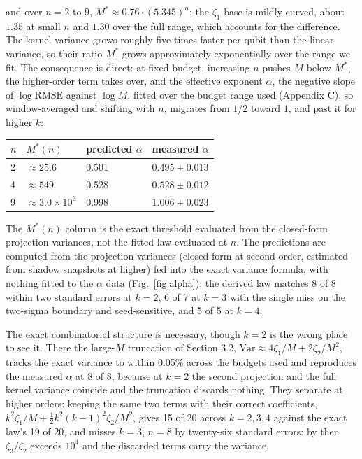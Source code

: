 \documentclass[a4paper,superscriptaddress,nofootinbib,onecolumn,nopdfoutputerror]{quantumarticle}
\begin{document}
and over \(n = 2\) to \(9\), \(M^* \approx 0.76 \cdot (5.345)^n\); the
\(\zeta_1\) base is mildly curved, about \(1.35\) at small \(n\) and
\(1.30\) over the full range, which accounts for the difference. The
kernel variance grows roughly five times faster per qubit than the linear
variance, so their ratio \(M^*\) grows approximately exponentially over
the range we fit. The consequence is direct: at fixed budget, increasing
\(n\) pushes \(M\) below \(M^*\), the higher-order term takes over, and the
effective exponent \(\alpha\), the negative slope of
\(\log \mathrm{RMSE}\) against \(\log M\), fitted over the budget range
used (Appendix C), so window-averaged and shifting with \(n\), migrates
from \(1/2\) toward \(1\), and past it for higher \(k\):

\begin{center}
\setlength{\tabcolsep}{10pt}
\begin{tabular}{@{}llll@{}}
\toprule
\(n\) & \(M^*(n)\) & predicted \(\alpha\) & measured \(\alpha\) \\
\midrule
2 & \(\approx 25.6\) & 0.501 & \(0.495 \pm 0.013\) \\
4 & \(\approx 549\) & 0.528 & \(0.528 \pm 0.012\) \\
9 & \(\approx 3.0 \times 10^{6}\) & 0.998 & \(1.006 \pm 0.023\) \\
\bottomrule
\end{tabular}
\end{center}

The \(M^*(n)\) column is the exact threshold evaluated from the
closed-form projection variances, not the fitted law evaluated at \(n\).
The predictions are computed from the projection variances (closed-form
at second order, estimated from shadow snapshots at higher) fed into
the exact variance formula, with nothing fitted to the \(\alpha\) data
(Fig.~\ref{fig:alpha}): the derived law matches 8 of 8 within two standard
errors at \(k = 2\), 6 of 7 at \(k = 3\) with the single miss on the
two-sigma boundary and seed-sensitive, and 5 of 5 at \(k = 4\).

The exact combinatorial structure is necessary, though \(k = 2\) is the
wrong place to see it. There the large-\(M\) truncation of Section 3.2,
\(\mathrm{Var} \approx 4\zeta_1/M + 2\zeta_2/M^2\), tracks the exact
variance to within 0.05\% across the budgets used and reproduces the
measured \(\alpha\) at 8 of 8, because at \(k = 2\) the second projection
and the full kernel variance coincide and the truncation discards nothing.
They separate at higher orders: keeping the same two terms with their
correct coefficients,
\(k^2\zeta_1/M + \tfrac{1}{2}k^2(k-1)^2\zeta_2/M^2\), gives 15 of 20
across \(k = 2, 3, 4\) against the exact law's 19 of 20, and misses
\(k = 3\), \(n = 8\) by twenty-six standard errors: by then
\(\zeta_3/\zeta_2\) exceeds \(10^4\) and the discarded terms carry the
variance.
\end{document}
